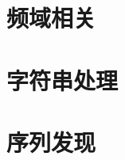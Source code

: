 \documentclass[cn,11pt,mode=simple,table]{elegantbook}
\begin{document}
\chapter{频域相关}









\chapter{字符串处理}






\chapter{序列发现}


\end{document}
